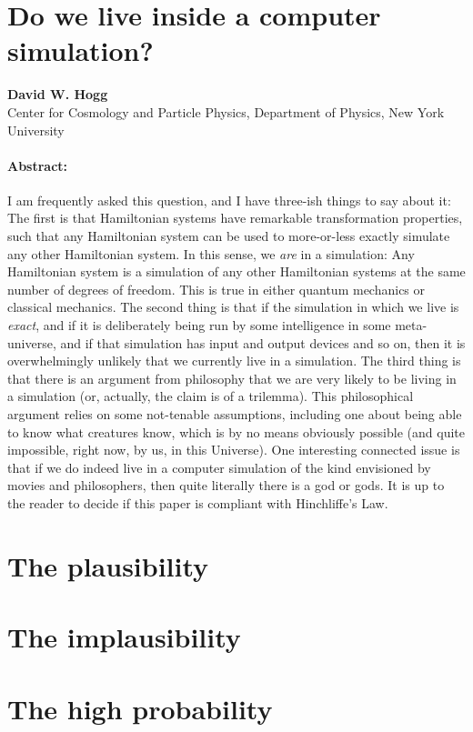 \documentclass[12pt,letterpaper]{article}
\begin{document}
\section*{Do we live inside a computer simulation?}

\noindent
\textbf{David W. Hogg}\\
\footnotesize{Center for Cosmology and Particle Physics, Department of Physics, New York University}

\paragraph{Abstract:}
I am frequently asked this question, and I have three-ish things to
say about it:
The first is that Hamiltonian systems have remarkable transformation
properties, such that any Hamiltonian system can be used to
more-or-less exactly simulate any other Hamiltonian system.
In this sense, we \emph{are} in a simulation: Any Hamiltonian system
is a simulation of any other Hamiltonian systems at the same number of
degrees of freedom.
This is true in either quantum mechanics or classical mechanics.
The second thing is that if the simulation in which we live is
\emph{exact}, and if it is deliberately being run by some intelligence
in some meta-universe, and if that simulation has input and output
devices and so on, then it is overwhelmingly unlikely that we
currently live in a simulation.
The third thing is that there is an argument from philosophy that we
are very likely to be living in a simulation (or, actually, the claim
is of a trilemma).
This philosophical argument relies on some not-tenable assumptions,
including one about being able to know what creatures know, which is
by no means obviously possible (and quite impossible, right now, by
us, in this Universe).
One interesting connected issue is that if we do indeed live in a
computer simulation of the kind envisioned by movies and philosophers,
then quite literally there is a god or gods.
It is up to the reader to decide if this paper is compliant with
Hinchliffe's Law.

\section{The plausibility}

\section{The implausibility}

\section{The high probability}
\end{document}
